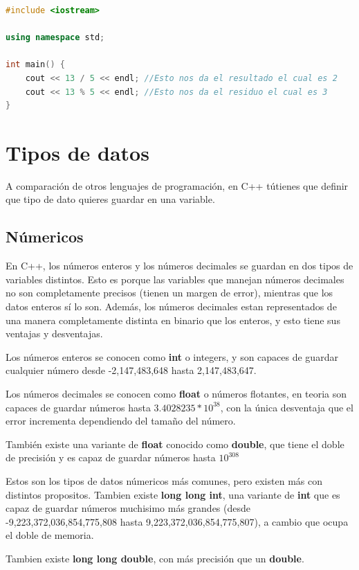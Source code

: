 \documentclass{article}
\begin{document}
\begin{lstlisting}[language=C++, title=Operaciones basicas]
#include <iostream>

using namespace std;

int main() {
	cout << 13 / 5 << endl; //Esto nos da el resultado el cual es 2
	cout << 13 % 5 << endl; //Esto nos da el residuo el cual es 3
}
\end{lstlisting}

\section{Tipos de datos}

A comparación de otros lenguajes de programación, en C++ tútienes que definir que tipo de dato quieres guardar en una variable.

\subsection{Númericos}

En C++, los números enteros y los números decimales se guardan en dos tipos de variables distintos. Esto es porque las variables que manejan números decimales no son completamente precisos (tienen un margen de error), mientras que los datos enteros sí lo son. Además, los números decimales estan representados de una manera completamente distinta en binario que los enteros, y esto tiene sus ventajas y desventajas.

Los números enteros se conocen como \textbf{int} o integers, y son capaces de guardar cualquier número desde -2,147,483,648 hasta 2,147,483,647.

Los números decimales se conocen como \textbf{float} o números flotantes, en teoria son capaces de guardar números hasta $3.4028235*10^{38}$, con la única desventaja que el error incrementa dependiendo del tamaño del número.

También existe una variante de \textbf{float} conocido como \textbf{double}, que tiene el doble de precisión y es capaz de guardar números hasta $10^{308}$

Estos son los tipos de datos númericos más comunes, pero existen más con distintos propositos. Tambien existe \textbf{long long int}, una variante de \textbf{int} que es capaz de guardar números muchisimo más grandes (desde -9,223,372,036,854,775,808 hasta 9,223,372,036,854,775,807), a cambio que ocupa el doble de memoria.

Tambien existe \textbf{long long double}, con más precisión que un \textbf{double}.
\end{document}
